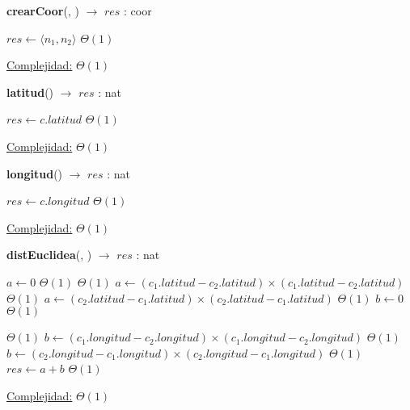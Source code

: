 \begin{Algoritmos}
   
\begin{algorithm}[H]{\textbf{crearCoor}(, ) $\to$ $res$ : coor}
    	\begin{algorithmic}[1]
			 \State $res \gets  \langle n_1 , n_2 \rangle $ \Comment $\Theta(1)$

			\medskip
			\Statex \underline{Complejidad:} $\Theta(1)$
    	\end{algorithmic}
\end{algorithm}
   
\begin{algorithm}[H]{\textbf{latitud}() $\to$ $res$ : nat}
    	\begin{algorithmic}[1]
			 \State $res \gets  c.latitud $ \Comment $\Theta(1)$

			\medskip
			\Statex \underline{Complejidad:} $\Theta(1)$
    	\end{algorithmic}
\end{algorithm}


\begin{algorithm}[H]{\textbf{longitud}() $\to$ $res$ : nat}
    	\begin{algorithmic}[1]
			 \State $res \gets  c.longitud $ \Comment $\Theta(1)$

			\medskip
			\Statex \underline{Complejidad:} $\Theta(1)$
    	\end{algorithmic}
\end{algorithm}

\begin{algorithm}[H]{\textbf{distEuclidea}(, ) $\to$ $res$ : nat}
    	\begin{algorithmic}[1]
    		 \State $a \gets 0$ \Comment $\Theta(1)$
    		 	\Comment $\Theta(1)$
				\State $a \gets (c_1.latitud - c_2.latitud) \times (c_1.latitud - c_2.latitud)$ \Comment $\Theta(1)$	
			\Else 
				\State $a \gets (c_2.latitud - c_1.latitud) \times (c_2.latitud - c_1.latitud)$ \Comment $\Theta(1)$	
			\EndIf
			\State $b \gets 0$ \Comment $\Theta(1)$

				\Comment $\Theta(1)$
				\State $b \gets (c_1.longitud - c_2.longitud) \times (c_1.longitud - c_2.longitud)$ \Comment $\Theta(1)$	
			\Else 
				\State $b \gets (c_2.longitud - c_1.longitud) \times (c_2.longitud - c_1.longitud)$ \Comment $\Theta(1)$	
			\EndIf
			\State $res \gets  a + b$ \Comment $\Theta(1)$

			\medskip
			\Statex \underline{Complejidad:} $\Theta(1)$
    	\end{algorithmic}
\end{algorithm}

\end{Algoritmos}